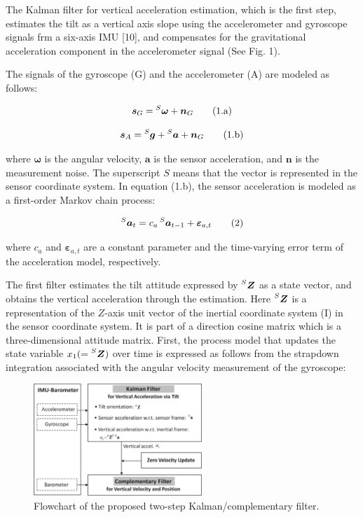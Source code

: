 \documentclass[10pt,journal,compsoc]{IEEEtran}
\begin{document}
The Kalman filter for vertical acceleration estimation, which is the first
step, estimates the tilt as a vertical axis slope using the accelerometer and
gyroscope signals frm a six-axis IMU [10], and compensates for the
gravitational acceleration component in the accelerometer signal (See Fig. 1).

The signals of the gyroscope (G) and the accelerometer (A) are modeled as
follows:

\[\bm{s}_G = \prescript{S}{}{\bm{\omega}}+\bm{n}_G\tag{1.a}\]

\[\bm{s}_A = \prescript{S}{}{\bm{g}}+\prescript{S}{}{\bm{a}}+\bm{n}_G\tag{1.b}\]


\noindent where $\bm{\omega}$ is the angular velocity, $\bm{a}$ is the sensor
acceleration, and $\bm{n}$ is the measurement noise. The superscript $S$ 
means that the vector is represented in the sensor coordinate system. In
equation (1.b), the sensor acceleration is modeled as a first-order Markov
chain process:

\[\prescript{S}{}{\bm{a}_t} = c_a\prescript{S}{}{\bm{a}_{t-1}}+\bm{\varepsilon}_{a,t}\tag{2}\]

\noindent where $c_a$ and $\bm{\varepsilon}_{a,t}$ are a constant parameter and
the time-varying error term of the acceleration model, respectively.

The first filter estimates the tilt attitude expressed by
$\prescript{S}{}{\bm{Z}}$ as a state vector, and obtains the vertical
acceleration through the estimation. Here $\prescript{S}{}{\bm{Z}}$ is a
representation of the $Z$-axis unit vector of the inertial coordinate system (I) in
the sensor coordinate system.  It is part of a direction cosine matrix which is
a three-dimensional attitude matrix. First, the process model that updates the
state variable $x_1 (= \prescript{S}{}{\bm{Z}})$ over time is expressed as
follows from the strapdown integration associated with the angular velocity
measurement of the gyroscope:

\begin{figure}[!t]
\centering
\includegraphics[width=2.5in]{fig1}
    \caption{Flowchart of the proposed two-step Kalman/complementary filter.}
\label{fig1}
\end{figure}
\end{document}
